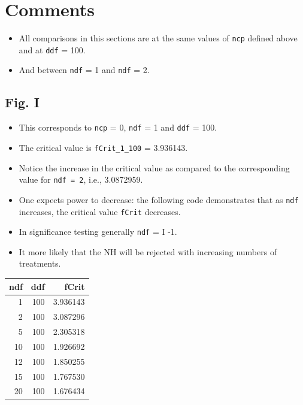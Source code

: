 \documentclass[
]{book}
\providecommand{\tightlist}{%
  \setlength{\itemsep}{0pt}\setlength{\parskip}{0pt}}
\begin{document}
\hypertarget{comments-2}{%
\section{Comments}\label{comments-2}}

\begin{itemize}
\tightlist
\item
  All comparisons in this sections are at the same values of \texttt{ncp} defined above and at \texttt{ddf} = 100.
\item
  And between \texttt{ndf} = 1 and \texttt{ndf} = 2.
\end{itemize}

\hypertarget{fig.-i}{%
\subsection{Fig. I}\label{fig.-i}}

\begin{itemize}
\tightlist
\item
  This corresponds to \texttt{ncp} = 0, \texttt{ndf} = 1 and \texttt{ddf} = 100.
\item
  The critical value is \texttt{fCrit\_1\_100} = 3.936143.
\item
  Notice the increase in the critical value as compared to the corresponding value for \texttt{ndf\ =\ 2}, i.e., 3.0872959.
\item
  One expects power to decrease: the following code demonstrates that as \texttt{ndf} increases, the critical value \texttt{fCrit} decreases.
\item
  In significance testing generally \texttt{ndf} = I -1.
\item
  It more likely that the NH will be rejected with increasing numbers of treatments.
\end{itemize}

\begin{tabular}{r|r|r}
\hline
ndf & ddf & fCrit\\
\hline
1 & 100 & 3.936143\\
\hline
2 & 100 & 3.087296\\
\hline
5 & 100 & 2.305318\\
\hline
10 & 100 & 1.926692\\
\hline
12 & 100 & 1.850255\\
\hline
15 & 100 & 1.767530\\
\hline
20 & 100 & 1.676434\\
\hline
\end{tabular}
\end{document}
